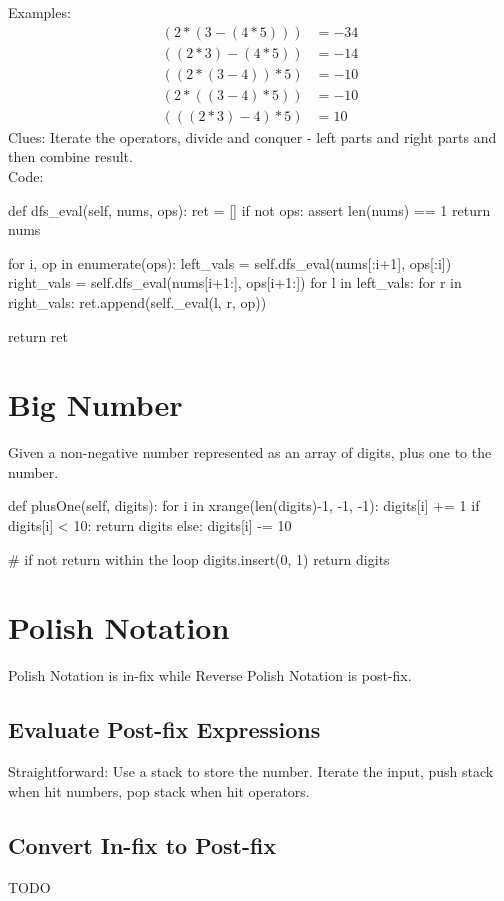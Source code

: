 Examples:
\begin{align*}
(2*(3-(4*5))) &= -34 \\
((2*3)-(4*5)) &= -14 \\
((2*(3-4))*5) &= -10 \\
(2*((3-4)*5)) &= -10 \\
(((2*3)-4)*5) &= 10
\end{align*}
Clues: Iterate the operators, divide and conquer - left parts and right parts and then combine result. \\
Code:
\begin{python}
def dfs_eval(self, nums, ops):
    ret = []
    if not ops:
        assert len(nums) == 1
        return nums

    for i, op in enumerate(ops):
        left_vals = self.dfs_eval(nums[:i+1], ops[:i])
        right_vals = self.dfs_eval(nums[i+1:], ops[i+1:])
        for l in left_vals:
            for r in right_vals:
                ret.append(self._eval(l, r, op))

    return ret
\end{python}

\section{Big Number}
 Given a non-negative number represented as an array of digits, plus one to the number.
\begin{python}
def plusOne(self, digits):
    for i in xrange(len(digits)-1, -1, -1):
        digits[i] += 1
        if digits[i] < 10:
            return digits
        else:
            digits[i] -= 10

    # if not return within the loop 
    digits.insert(0, 1)
    return digits
\end{python}

\section{Polish Notation}
Polish Notation is in-fix while Reverse Polish Notation is post-fix. 
\subsection{Evaluate Post-fix Expressions}
Straightforward: Use a stack to store the number. Iterate the input, push stack when
hit numbers, pop stack when hit operators.
\subsection{Convert In-fix to Post-fix}
TODO

